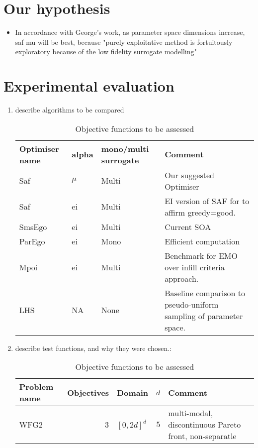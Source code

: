 \documentclass[runningheads]{llncs}
\begin{document}
\section{Our hypothesis}
\begin{itemize}
    \item In accordance with George's work, as parameter space dimensions increase, saf mu will be best, because "purely exploitative method is fortuitously exploratory because of the low fidelity surrogate modelling"
\end{itemize}


\section{Experimental evaluation}
\begin{enumerate}
    \item describe algorithms to be compared
        \begin{table}
        \caption{Objective functions to be assessed}\label{tab1}
        \begin{tabular}{|l|l|l|l|}
        \hline
        Optimiser name & alpha & mono/multi surrogate  & Comment\\
        \hline
        Saf & $\mu$ & Multi & Our suggested Optimiser  \\
        Saf & ei & Multi & EI version of SAF for to affirm greedy=good. \\
        SmsEgo & ei & Multi & Current SOA \\
        ParEgo & ei & Mono & Efficient computation \\
        Mpoi & ei & Multi & Benchmark for EMO over infill criteria approach. \\
        LHS & NA & None & Baseline comparison to pseudo-uniform sampling of parameter space. \\
        \hline
        \end{tabular}
        \end{table}
    \item describe test functions, and why they were chosen.:
        \begin{table}
        \caption{Objective functions to be assessed}\label{tab1}
        \begin{tabular}{|l|r|l|r|l|}
        \hline
        Problem name &  Objectives & Domain & $d$ & Comment\\
        \hline
        WFG2 & 3 & $[0, 2d]^d$ & $5$ & multi-modal, discontinuous Pareto front, non-separatle\\

\end{tabular}
\end{table}
\end{enumerate}
\end{document}
